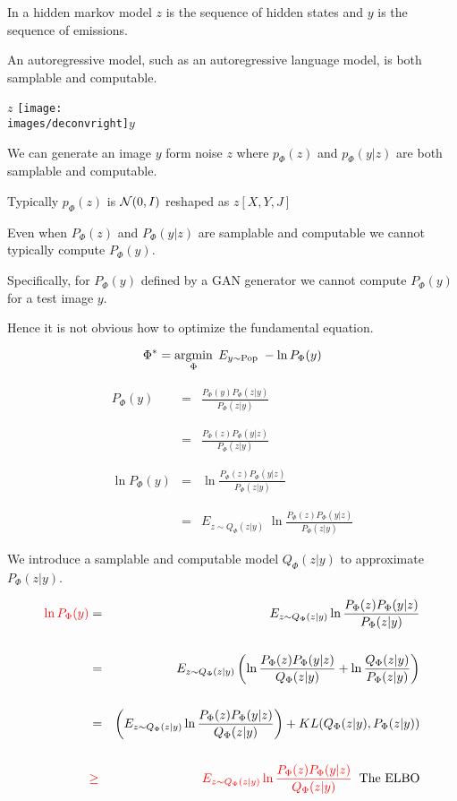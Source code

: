 {\vfill
In a hidden markov model $z$ is the sequence of hidden states and $y$ is the sequence of emissions.

\vfill
An autoregressive model, such as an autoregressive language model, is both samplable and computable.


\centerline{$z$ \texttt{[image: \\images/deconvright]}$y$}

\vfill
We can generate an image $y$ form noise $z$ where $p_\Phi(z)$ and $p_\Phi(y|z)$ are both samplable and computable.

\vfill
Typically $p_\Phi(z)$ is ${\cal N}(0,I)$ reshaped as $z[X,Y,J]$



\bigskip
\bigskip
Even when $P_\Phi(z)$ and $P_\Phi(y|z)$ are samplable and computable we cannot typically compute $P_\Phi(y)$.

\vfill
Specifically, for $P_\Phi(y)$ defined by a GAN generator we cannot compute $P_\Phi(y)$ for a test image $y$.

\vfill
Hence it is not obvious how to optimize the fundamental equation.

$$\Phi^* = \operatorname*{argmin}_\Phi\;E_{y \sim \mathrm{Pop}}\;- \ln P_\Phi(y)$$


{\huge
\begin{eqnarray*}
P_\Phi(y) & = & \frac{P_\Phi(y)P_\Phi(z|y)}{P_\Phi(z|y)} \\
\\
\\
& = & \frac{P_\Phi(z) P_\Phi(y|z)}{P_\Phi(z|y)} \\
\\
\\
\ln P_\Phi(y) & = & \ln \frac{P_\Phi(z) P_\Phi(y|z)}{P_\Phi(z|y)} \\
\\
\\
& = & E_{z \sim Q_\Phi(z|y)}\;\ln \frac{P_\Phi(z) P_\Phi(y|z)}{P_\Phi(z|y)}
\end{eqnarray*}
}


We introduce a samplable and computable model $Q_\Phi(z|y)$ to approximate $P_\Phi(z|y)$.

{\huge
\begin{eqnarray*}
 {\color{red} \ln P_\Phi(y)} & = & E_{z \sim Q_\Phi(z|y)} \ln \frac{P_\Phi(z)P_\Phi(y|z)}{P_\Phi(z|y)} \\
        \\
 & = & E_{z \sim Q_\Phi(z|y)} \left(\ln \frac{P_\Phi(z)P_\Phi(y|z)}{Q_\Phi(z|y)} + \ln \frac{Q_\Phi(z|y)}{P_\Phi(z|y)}\right) \\
 \\
  & = & \left(E_{z \sim Q_\Phi(z|y)} \ln \frac{P_\Phi(z)P_\Phi(y|z)}{Q_\Phi(z|y)}\right) + KL(Q_\Phi(z|y),P_\Phi(z|y)) \\
  \\
  & {\color{red} \geq} & {\color{red} E_{z \sim Q_\Phi(z|y)} \ln \frac{P_\Phi(z)P_\Phi(y|z)}{Q_\Phi(z|y)}}\;\;\mbox{The ELBO}
\end{eqnarray*}
}


}
